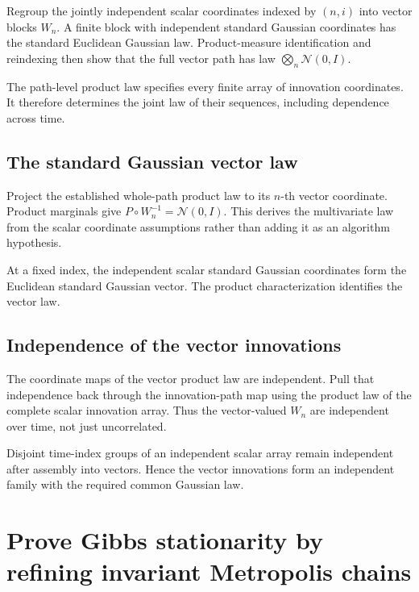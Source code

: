 \documentclass[11pt,a4paper]{article}
\begin{document}
Regroup the jointly independent scalar coordinates indexed by \((n,i)\) into vector blocks \(W_n\). A finite block with independent standard Gaussian coordinates has the standard Euclidean Gaussian law. Product-measure identification and reindexing then show that the full vector path has law \(\bigotimes_n\mathcal N(0,I)\).



The path-level product law specifies every finite array of innovation coordinates. It therefore determines the joint law of their sequences, including dependence across time.


\subsection{\texorpdfstring{The standard Gaussian vector law}{The standard Gaussian vector law}}


Project the established whole-path product law to its \(n\)-th vector coordinate. Product marginals give \(P\circ W_n^{-1}=\mathcal N(0,I)\). This derives the multivariate law from the scalar coordinate assumptions rather than adding it as an algorithm hypothesis.



At a fixed index, the independent scalar standard Gaussian coordinates form the Euclidean standard Gaussian vector. The product characterization identifies the vector law.


\subsection{\texorpdfstring{Independence of the vector innovations}{Independence of the vector innovations}}


The coordinate maps of the vector product law are independent. Pull that independence back through the innovation-path map using the product law of the complete scalar innovation array. Thus the vector-valued \(W_n\) are independent over time, not just uncorrelated.



Disjoint time-index groups of an independent scalar array remain independent after assembly into vectors. Hence the vector innovations form an independent family with the required common Gaussian law.


\section{\texorpdfstring{Prove Gibbs stationarity by refining invariant Metropolis chains}{Prove Gibbs stationarity by refining invariant Metropolis chains}}
\end{document}
